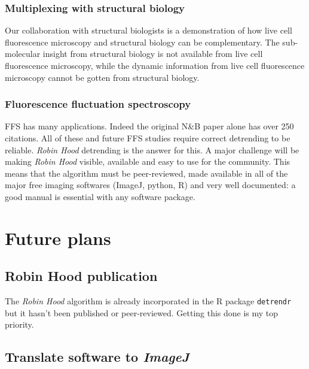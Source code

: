 \documentclass[12pt,]{book}
\theoremstyle{definition}
\theoremstyle{definition}
\theoremstyle{definition}
\theoremstyle{remark}
\begin{document}
\subsection{Multiplexing with structural
biology}\label{multiplexing-with-structural-biology}

Our collaboration with structural biologists \citep{HIVstoichiometry} is
a demonstration of how live cell fluorescence microscopy and structural
biology can be complementary. The sub-molecular insight from structural
biology is not available from live cell fluorescence microscopy, while
the dynamic information from live cell fluorescence microscopy cannot be
gotten from structural biology.

\subsection{Fluorescence fluctuation
spectroscopy}\label{fluorescence-fluctuation-spectroscopy-1}

FFS has many applications. Indeed the original N\&B paper \citep{NB}
alone has over 250 citations. All of these and future FFS studies
require correct detrending to be reliable. \emph{Robin Hood} detrending
is the answer for this. A major challenge will be making \emph{Robin
Hood} visible, available and easy to use for the community. This means
that the algorithm must be peer-reviewed, made available in all of the
major free imaging softwares (ImageJ, python, R) and very well
documented: a good manual is essential with any software package.

\chapter{Future plans}\label{future-plans}

\section{Robin Hood publication}\label{robin-hood-publication}

The \emph{Robin Hood} algorithm is already incorporated in the R package
\texttt{detrendr} but it hasn't been published or peer-reviewed. Getting
this done is my top priority.

\section{\texorpdfstring{Translate software to
\emph{ImageJ}}{Translate software to ImageJ}}\label{translate-software-to-imagej}
\end{document}
